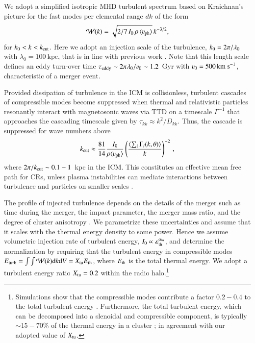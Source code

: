\documentclass[fleqn,usenatbib,useAMS]{mnras}
\newcommand{\Vph}{\varv_\mathrm{ph}}
\newcommand{\eps}{\varepsilon}
\begin{document}
We adopt a simplified isotropic MHD turbulent spectrum based on
Kraichnan's picture for the fast modes per elemental range $dk$ of the
form
\begin{equation}
  \label{eq:Wk}
  \mathcal{W}(k) =
\sqrt{2/7\,I_0\,\rho\,\langle \Vph \rangle}\,k^{-3/2},
\end{equation}
for $k_0<k<k_{\mathrm{cut}}$. Here we adopt an injection scale of the
turbulence, $k_0= 2\pi/\lambda_0$ with $\lambda_0 =100~\mbox{kpc}$,
that is in line with previous work
\citep{2006MNRAS.366.1437S,brunetti07,brunetti11}. Note that this
length scale defines an eddy turn-over time
$\tau_{\rmn{eddy}}\sim2\upi\lambda_0/\varv_0\sim1.2$~Gyr with
$\varv_0=500\,\rmn{km~s}^{-1}$, characteristic of a merger event.

Provided dissipation of turbulence in the ICM is collisionless,
turbulent cascades of compressible modes become suppressed when
thermal and relativistic particles resonantly interact with
magnetosonic waves via TTD on a timescale $\Gamma^{-1}$ that
approaches the cascading timescale given by $\tau_{kk} \approx
k^2/D_{kk}$. Thus, the cascade is suppressed for wave numbers above
\begin{equation}
\label{eq:kc}
  k_\rmn{cut} \approx \frac{81}{14} \frac{I_0}{\rho \langle \Vph \rangle}
  \left(\frac{\langle\sum_i \Gamma_i(k,\theta)\rangle}{k}\right)^{-2}\,,
\end{equation}
where $2\pi/k_{\mathrm{cut}}\sim 0.1-1$~kpc in the ICM. This constitutes an
effective mean free path for CRs, unless plasma instabilities can
mediate interactions between turbulence and particles on smaller
scales \citep{brunetti11}.

The profile of injected turbulence depends on the details of the
merger such as time during the merger, the impact parameter, the
merger mass ratio, and the degree of cluster anisotropy
\citep{2015ApJ...800...60M}. We parametrize these uncertainties and
assume that it scales with the thermal energy density to some
power. Hence we assume volumetric injection rate of turbulent energy,
$I_0\propto \eps_\rmn{th}^{\alpha_\rmn{tu}}$, and determine the
normalization by requiring that the turbulent energy in compressible
modes $E_{\mathrm{turb}}=\int \int \mathcal{W}(k) {\mathrm{d}}k {\mathrm{d}}V =
X_{\mathrm{tu}} E_{\mathrm{th}}$, where $E_{\mathrm{th}}$ is the total thermal
energy. We adopt a turbulent energy ratio $X_{\mathrm{tu}}=0.2$ within the
radio halo.\footnote{Simulations show that the compressible modes
  contribute a factor $0.2-0.4$ to the total turbulent energy
  \citep{2013ApJ...771..131B,2015ApJ...800...60M}. Furthermore, the
  total turbulent energy, which can be decomposed into a slenoidal and
  compressible component, is typically $\sim15-70$\% of the thermal
  energy in a cluster \citep{2011A&A...529A..17V}; in agreement with
  our adopted value of $X_{\mathrm{tu}}$.}
\end{document}
